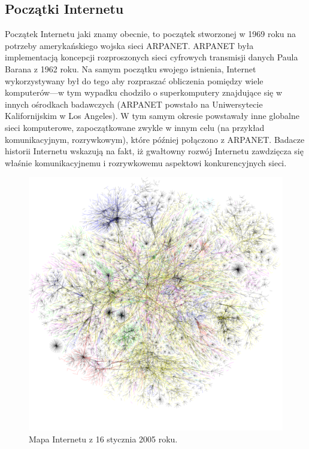 \subsection{Początki Internetu}
Początek Internetu jaki znamy obecnie, to początek stworzonej w 1969 roku na
potrzeby amerykańskiego wojska sieci ARPANET. ARPANET była implementacją
koncepcji rozproszonych sieci cyfrowych transmisji danych Paula Barana z 1962
roku. Na samym początku swojego istnienia, Internet wykorzystywany był do tego
aby rozpraszać obliczenia pomiędzy wiele komputerów---w tym wypadku chodziło o
superkomputery znajdujące się w innych ośrodkach badawczych (ARPANET powstało na
Uniwersytecie Kalifornijskim w Los Angeles). W tym samym okresie powstawały inne
globalne sieci komputerowe, zapoczątkowane zwykle w innym celu (na przykład
komunikacyjnym, rozrywkowym), które później połączono z ARPANET. Badacze
historii Internetu wskazują na fakt, iż gwałtowny rozwój Internetu zawdzięcza
się właśnie komunikacyjnemu i rozrywkowemu aspektowi konkurencyjnych sieci.

\begin{figure}
	\includegraphics[width=\textwidth,height=\textheight,keepaspectratio]{img/01.png}
	\caption{Mapa Internetu z 16 stycznia 2005 roku.}
\end{figure}

